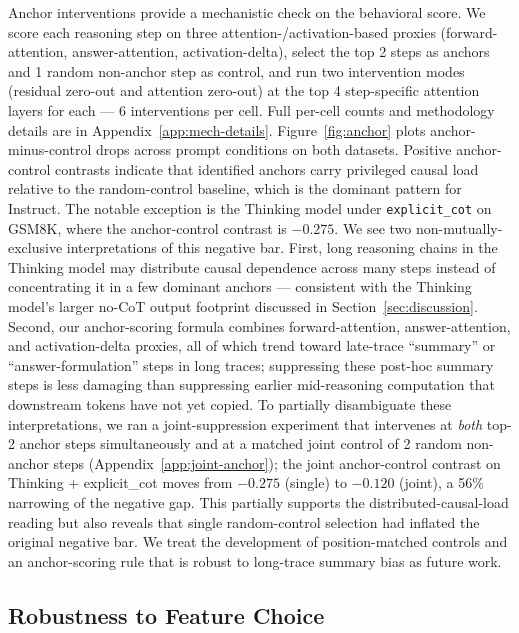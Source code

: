 \documentclass{article}
\theoremstyle{plain}
\theoremstyle{definition}
\theoremstyle{remark}
\begin{document}
Anchor interventions provide a mechanistic check on the behavioral score. We score each reasoning step on three attention-/activation-based proxies (forward-attention, answer-attention, activation-delta), select the top 2 steps as anchors and 1 random non-anchor step as control, and run two intervention modes (residual zero-out and attention zero-out) at the top 4 step-specific attention layers for each --- 6 interventions per cell. Full per-cell counts and methodology details are in Appendix~\ref{app:mech-details}. Figure~\ref{fig:anchor} plots anchor-minus-control drops across prompt conditions on both datasets. Positive anchor-control contrasts indicate that identified anchors carry privileged causal load relative to the random-control baseline, which is the dominant pattern for Instruct. The notable exception is the Thinking model under \texttt{explicit\_cot} on GSM8K, where the anchor-control contrast is $-0.275$. We see two non-mutually-exclusive interpretations of this negative bar. First, long reasoning chains in the Thinking model may distribute causal dependence across many steps instead of concentrating it in a few dominant anchors --- consistent with the Thinking model's larger no-CoT output footprint discussed in Section~\ref{sec:discussion}. Second, our anchor-scoring formula combines forward-attention, answer-attention, and activation-delta proxies, all of which trend toward late-trace ``summary'' or ``answer-formulation'' steps in long traces; suppressing these post-hoc summary steps is less damaging than suppressing earlier mid-reasoning computation that downstream tokens have not yet copied. To partially disambiguate these interpretations, we ran a joint-suppression experiment that intervenes at \emph{both} top-2 anchor steps simultaneously and at a matched joint control of 2 random non-anchor steps (Appendix~\ref{app:joint-anchor}); the joint anchor-control contrast on Thinking + explicit\_cot moves from $-0.275$ (single) to $-0.120$ (joint), a 56\% narrowing of the negative gap. This partially supports the distributed-causal-load reading but also reveals that single random-control selection had inflated the original negative bar. We treat the development of position-matched controls and an anchor-scoring rule that is robust to long-trace summary bias as future work.

\FloatBarrier
\subsection{Robustness to Feature Choice}
\label{sec:robustness}
\end{document}
